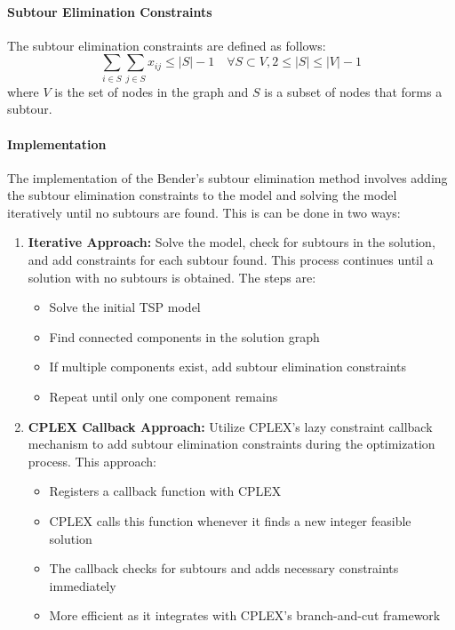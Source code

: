\documentclass{article}
\begin{document}
\paragraph{Subtour Elimination Constraints}
The subtour elimination constraints are defined as follows: 
\begin{equation}
	\sum_{i \in S} \sum_{j \in S} x_{ij} \leq |S| - 1 \quad \forall S \subset V, 2 \leq |S| \leq |V| - 1
\end{equation}
where $V$ is the set of nodes in the graph and $S$ is a subset of nodes that forms a subtour.

\paragraph{Implementation}
The implementation of the Bender's subtour elimination method involves adding the subtour elimination constraints to the model and solving the model iteratively until no subtours are found.
This is can be done in two ways:
\begin{enumerate}
    \item \textbf{Iterative Approach:} Solve the model, check for subtours in the solution, and add constraints for each subtour found. This process continues until a solution with no subtours is obtained. The steps are:
    \begin{itemize}
        \item Solve the initial TSP model
        \item Find connected components in the solution graph
        \item If multiple components exist, add subtour elimination constraints
        \item Repeat until only one component remains
    \end{itemize}
    
    \item \textbf{CPLEX Callback Approach:} Utilize CPLEX's lazy constraint callback mechanism to add subtour elimination constraints during the optimization process. This approach:
    \begin{itemize}
        \item Registers a callback function with CPLEX
        \item CPLEX calls this function whenever it finds a new integer feasible solution
        \item The callback checks for subtours and adds necessary constraints immediately
        \item More efficient as it integrates with CPLEX's branch-and-cut framework
    \end{itemize}
\end{enumerate}
\end{document}
